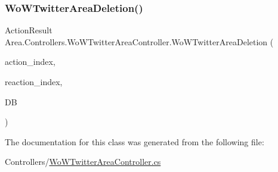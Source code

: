 \mbox{\label{classArea_1_1Controllers_1_1WoWTwitterAreaController_a5599b8a1304ec0e64221de7b100f1bc0}} 
\subsubsection{\texorpdfstring{Wo\+W\+Twitter\+Area\+Deletion()}{WoWTwitterAreaDeletion()}}
{\footnotesize\ttfamily Action\+Result Area.\+Controllers.\+Wo\+W\+Twitter\+Area\+Controller.\+Wo\+W\+Twitter\+Area\+Deletion (\begin{DoxyParamCaption}\item[{string}]{action\+\_\+index,  }\item[{string}]{reaction\+\_\+index,  }\item[{\mbox{[}\+From\+Services\mbox{]} \mbox{\hyperlink{classArea_1_1DAT_1_1AreaDbContext}{Area\+Db\+Context}}}]{DB }\end{DoxyParamCaption})\hspace{0.3cm}{\ttfamily [inline]}}



The documentation for this class was generated from the following file\+:\begin{DoxyCompactItemize}
\item 
Controllers/\mbox{\hyperlink{WoWTwitterAreaController_8cs}{Wo\+W\+Twitter\+Area\+Controller.\+cs}}\end{DoxyCompactItemize}
